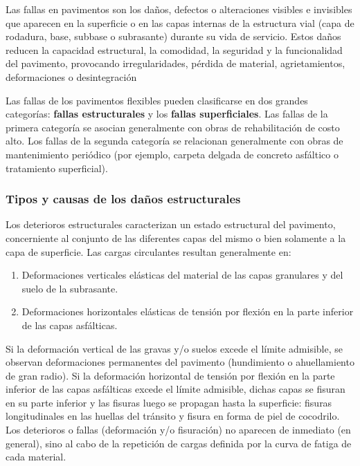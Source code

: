 Las fallas en pavimentos son los daños, defectos o alteraciones visibles e invisibles que aparecen en la superficie o en las capas internas de la estructura vial (capa de rodadura, base, subbase o subrasante) durante su vida de servicio. Estos daños reducen la capacidad estructural, la comodidad, la seguridad y la funcionalidad del pavimento, provocando irregularidades, pérdida de material, agrietamientos, deformaciones o desintegración 

\noindent Las fallas de los pavimentos flexibles pueden clasificarse en dos grandes categorías: \textbf{fallas estructurales} y los \textbf{fallas superficiales}. Las fallas de la primera categoría se asocian generalmente con obras de rehabilitación de costo alto. Los fallas de la segunda categoría se relacionan generalmente con obras de mantenimiento periódico (por ejemplo, carpeta delgada de concreto asfáltico o tratamiento superficial).\textcite{ManualCarreteras2018}

\subsubsection{Tipos y causas de los daños estructurales}
Los deterioros estructurales caracterizan un estado estructural del pavimento, concerniente al conjunto de las diferentes capas del mismo o bien solamente a la capa de superficie.
Las cargas circulantes resultan generalmente en:

\begin{enumerate}
	\item Deformaciones verticales elásticas del material de las capas granulares y del suelo de la subrasante.
	\item Deformaciones horizontales elásticas de tensión por flexión en la parte inferior de las capas asfálticas.
\end{enumerate}
Si la deformación vertical de las gravas y/o suelos excede el límite admisible, se observan deformaciones permanentes del pavimento (hundimiento o ahuellamiento de gran radio). Si la deformación horizontal de tensión por flexión en la parte inferior de las capas asfálticas excede el límite admisible, dichas capas se fisuran en su parte inferior y las fisuras luego se propagan hasta la superficie: fisuras longitudinales en las huellas del tránsito y fisura en forma de piel de cocodrilo.\\
Los deterioros o fallas (deformación y/o fisuración) no aparecen de inmediato (en general), sino al cabo de la repetición de cargas definida por la curva de fatiga de cada material.


